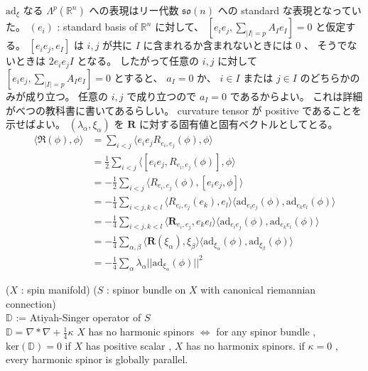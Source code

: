 \begin{Proof}
\itemprof
  \(\text{ad}_{\xi}\) なる \(\Lambda^p(\mathbb{R}^n)\) への表現はリー代数 \(\mathfrak{so}(n)\) への standard な表現となっていた。
  \((e_i)\) : standard basis of \(\mathbb{R}^n\) に対して、 \([e_i e_j , \sum_{|I| = p} A_I e_I] = 0\) と仮定する。 \([e_i e_j , e_I]\) は \(i,j\) が共に \(I\) に含まれるか含まれないときには \(0\) 、 そうでないときは \(2 e_i e_j I\) となる。
  したがって任意の \(i,j\) に対して \([e_i e_j , \sum_{|I| = p} A_I e_I] = 0\) とすると、 \(a_I = 0\) か、 \(i \in I\) または \(j \in I\) のどちらかのみが成り立つ。
  任意の \(i,j\) で成り立つので \(a_I = 0\) であるからよい。
\itemprof
  これは詳細がべつの教科書に書いてあるらしい。
\itemprof
  curvature tensor が positive であることを示せばよい。
  \((\lambda_\alpha , \xi_\alpha)\) を \(\mathbf{R}\) に対する固有値と固有ベクトルとしてとる。
  \begin{align*}
    \langle \mathfrak{R} (\phi) , \phi \rangle
    &= \sum_{i < j} \langle e_i e_j R_{e_i , e_j} (\phi) , \phi \rangle \\
    &= \frac{1}{2} \sum_{i < j} \langle [e_i e_j , R_{e_i , e_j}(\phi)] , \phi \rangle \\
    &= -\frac{1}{2} \sum_{i < j} \langle R_{e_i , e_j}(\phi) , [e_i e_j , \phi] \rangle \\
    &= -\frac{1}{4} \sum_{i < j , k < l}
    \langle R_{e_i , e_j}(e_k) , e_l \rangle \langle \text{ad}_{e_i e_j}(\phi) , \text{ad}_{e_k e_l}(\phi) \rangle \\
    &= -\frac{1}{4} \sum_{i<j,k<l} \langle \mathbf{R}_{e_i , e_j} , e_k e_l \rangle \langle \text{ad}_{e_i e_j} (\phi) , \text{ad}_{e_k e_l} (\phi) \rangle \\
    &= - \frac{1}{4} \sum_{\alpha , \beta} \langle \mathbf{R}(\xi_{\alpha}) , \xi_{\beta} \rangle \langle \text{ad}_{\xi_\alpha}(\phi) , \text{ad}_{\xi_\beta}(\phi) \rangle \\
    &= - \frac{1}{4} \sum_{\alpha} \lambda_\alpha || \text{ad}_{\xi_\alpha}(\phi) ||^2
  \end{align*}
\end{Proof}

\begin{Theorem}
\itemprop
  \For (\(X\) : spin manifold) (\(S\) : spinor bundle on \(X\) with canonical riemannian connection) \\
  \Let \(\mathbb{D}\) := Atiyah-Singer operator of \(S\) \\
  \Then \(\mathbb{D} = \nabla * \nabla + \frac{1}{4} \kappa\)
\itemdefi
  \(X\) has no harmonic spinors \(\iff\) for any spinor bundle , \(\text{ker}(\mathbb{D}) = 0\)
\itemprop
  if \(X\) has positive scalar , \(X\) has no harmonix spinors.
\itemprop
  if \(\kappa = 0\) , every harmonic spinor is globally parallel. 
\end{Theorem}

